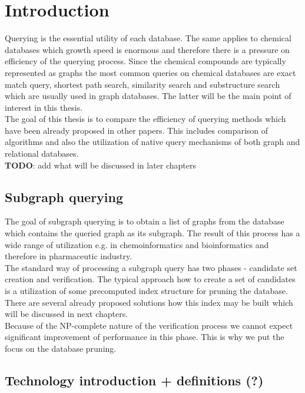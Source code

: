 

\chapter{Introduction}

Querying is the essential utility of each database. The same applies to chemical databases which growth speed is enormous and therefore there is a pressure on efficiency of the querying process. Since the chemical compounds are typically represented as graphs the most common queries on chemical databases are exact match query, shortest path search, similarity search and substructure search which are usually used in graph databases. The latter will be the main point of interest in this thesis.\\


The goal of this thesis is to compare the efficiency of querying methods which have been already proposed in other papers. This includes comparison of algorithms and also the utilization of native query mechanisms of both graph and relational databases.\\

\textbf{TODO}: add what will be discussed in later chapters


\section{Subgraph querying}

The goal of subgraph querying is to obtain a list of graphs from the database which contains the queried graph as its subgraph. The result of this process has a wide range of utilization e.g. in chemoinformatics and bioinformatics and therefore in pharmaceutic industry.\\


The standard way of processing a subgraph query has two phases - candidate set creation and verification. The typical approach how to create a set of candidates is a utilization of some precomputed index structure for pruning the database. There are several already proposed solutions how this index may be built which will be discussed in next chapters.\\

Because of the NP-complete nature of the verification process we cannot expect significant improvement of performance in this phase. This is why we put the focus on the database pruning.


\section{Technology introduction + definitions (?)}

